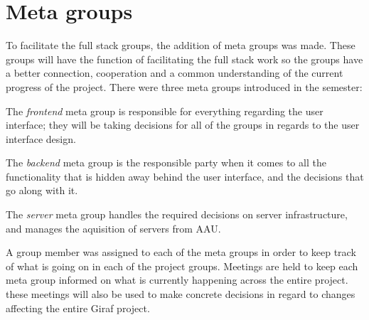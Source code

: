 \section{Meta groups}\label{SEC:MetaGroups}
To facilitate the full stack groups, the addition of meta groups was made.
These groups will have the function of facilitating the full stack work so the groups have a better connection, cooperation and a common understanding of the current progress of the project.
There were three meta groups introduced in the semester:

The \textit{frontend} meta group is responsible for everything regarding the user interface; they will be taking decisions for all of the groups in regards to the user interface design.

The \textit{backend} meta group is the responsible party when it comes to all the functionality that is hidden away behind the user interface, and the decisions that go along with it.

The \textit{server} meta group handles the required decisions on server infrastructure, and manages the aquisition of servers from AAU.

A group member was assigned to each of the meta groups in order to keep track of what is going on in each of the project groups. 
Meetings are held to keep each meta group informed on what is currently happening across the entire project. 
these meetings will also be used to make concrete decisions in regard to changes affecting the entire Giraf project.

